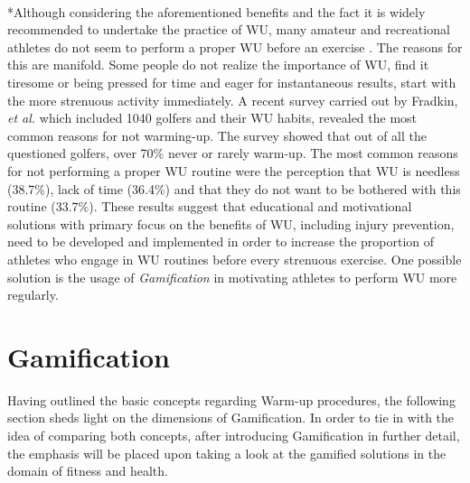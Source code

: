 \\*Although considering the aforementioned benefits and the fact it is widely recommended to undertake the practice of WU, many amateur and recreational athletes do not seem to perform a proper WU before an exercise \cite{fradkin2010effects}. The reasons for this are manifold. Some people do not realize the importance of WU, find it tiresome or being pressed for time and eager for instantaneous results, start with the more strenuous activity immediately. A recent survey carried out by Fradkin, \textit{et al.} which included 1040 golfers and their WU habits, revealed the most common reasons for not warming-up. The survey showed that out of all the questioned golfers, over 70\% never or rarely warm-up. The most common reasons for not performing a proper WU routine were the perception that WU is needless (38.7\%), lack of time (36.4\%) and that they do not want to be bothered with this routine (33.7\%).
These results suggest that educational and motivational solutions with primary focus on the benefits of WU, including injury prevention, need to be developed and implemented in order to increase the proportion of athletes who engage in WU routines before every strenuous exercise. One possible solution is the usage of \textit{Gamification} in motivating athletes to perform WU more regularly. 
\pagebreak
\section{Gamification}
Having outlined the basic concepts regarding Warm-up procedures, the following section sheds light 
on the dimensions of Gamification. In order to tie in with the idea of comparing both concepts, after  introducing Gamification in further detail, the emphasis will be placed upon taking a look at the 
gamified solutions in the domain of fitness and health. 
